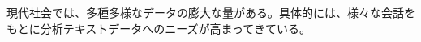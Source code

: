 \documentclass[shuuron]{kuee}
\begin{document}
現代社会では、多種多様なデータの膨大な量がある。具体的には、様々な会話をもとに分析テキストデータへのニーズが高まってきている。
%
\end{document}
